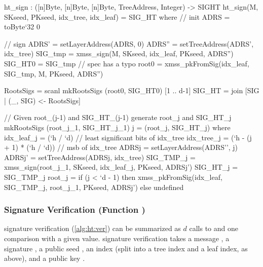 \begin{code}
  ht_sign : ([n]Byte, [n]Byte, [n]Byte, TreeAddress, Integer) -> SIGHT
  ht_sign(M, SKseed, PKseed, idx_tree, idx_leaf) = SIG_HT where
    // init
    ADRS = toByte`{32} 0

    // sign
    ADRS' = setLayerAddress(ADRS, 0)
    ADRS'' = setTreeAddress(ADRS', idx_tree)
    SIG_tmp = xmss_sign(M, SKseed, idx_leaf, PKseed, ADRS'')
    SIG_HT0 = SIG_tmp // spec has a typo
    root0 = xmss_pkFromSig(idx_leaf, SIG_tmp, M, PKseed, ADRS'')

    RootsSigs = scanl mkRootsSigs (root0, SIG_HT0) [1 .. d-1]
    SIG_HT = join [SIG | (_, SIG) <- RootsSigs]

    // Given root_(j-1) and SIG_HT_(j-1) generate root_j and SIG_HT_j
    mkRootsSigs (root_j_1, SIG_HT_j_1) j = (root_j, SIG_HT_j) where
      idx_leaf_j = (`h / `d) // least significant bits of idx_tree
      idx_tree_j = (`h - (j + 1) * (`h / `d)) // msb of idx_tree
      ADRSj = setLayerAddress(ADRS'', j)
      ADRSj' = setTreeAddress(ADRSj, idx_tree)
      SIG_TMP_j = xmss_sign(root_j_1, SKseed, idx_leaf_j, PKseed, ADRSj')
      SIG_HT_j = SIG_TMP_j
      root_j =
        if (j < `d - 1) then
          xmss_pkFromSig(idx_leaf, SIG_TMP_j, root_j_1, PKseed, ADRSj')
        else  
          undefined
\end{code}

\subsubsection{\hyper Signature Verification (Function \htverify)}

   \hyper signature verification (\autoref{alg:ht:ver}) can be summarized as $d$
   calls to \xmsspkfromsig and one comparison with a given value. \hyper 
   signature verification takes a message \msg, a signature \htsig, a public seed \pseed, an index 
   \idx (split into a tree index and a leaf index, as above), and a \hyper public key \htpk.

